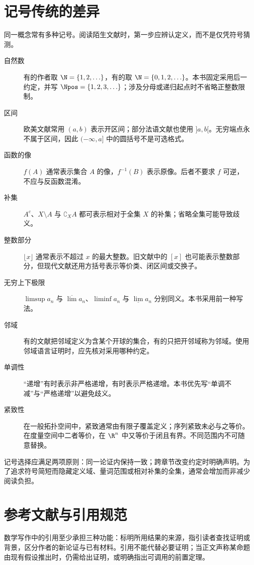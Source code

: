 \section{记号传统的差异}

同一概念常有多种记号。阅读陌生文献时，第一步应辨认定义，而不是仅凭符号猜测。

\begin{description}
 \item[自然数] 有的作者取 $\N=\{1,2,\ldots\}$，有的取 $\N=\{0,1,2,\ldots\}$。本书固定采用后一约定，并写 $\Npos=\{1,2,3,\ldots\}$；涉及分母或递归起点时不省略正整数限制。
 \item[区间] 欧美文献常用 $(a,b)$ 表示开区间；部分法语文献也使用 $]a,b[$。无穷端点永不属于区间，因此 $(-\infty,a]$ 中的圆括号不是可选格式。
 \item[函数的像] $f(A)$ 通常表示集合 $A$ 的像，$f^{-1}(B)$ 表示原像。后者不要求 $f$ 可逆，不应与反函数混淆。
 \item[补集] $A^c$、$X\setminus A$ 与 $\complement_X A$ 都可表示相对于全集 $X$ 的补集；省略全集可能导致歧义。
 \item[整数部分] $\lfloor x\rfloor$ 通常表示不超过 $x$ 的最大整数。旧文献中的 $[x]$ 也可能表示整数部分，但现代文献还用方括号表示等价类、闭区间或交换子。
 \item[无穷上下极限] $\limsup a_n$ 与 $\overline{\lim}a_n$、$\liminf a_n$ 与 $\underline{\lim}a_n$ 分别同义。本书采用前一种写法。
 \item[邻域] 有的文献把邻域定义为含某个开球的集合，有的只把开邻域称为邻域。使用邻域语言证明时，应先核对采用哪种约定。
 \item[单调性] “递增”有时表示非严格递增，有时表示严格递增。本书优先写“单调不减”与“严格递增”以避免歧义。
 \item[紧致性] 在一般拓扑空间中，紧致通常由有限子覆盖定义；序列紧致未必与之等价。在度量空间中二者等价，在 $\R^n$ 中又等价于闭且有界。不同范围内不可随意替换。
\end{description}

记号选择应满足两项原则：同一论证内保持一致；跨章节改变约定时明确声明。为了追求符号简短而隐藏定义域、量词范围或相对补集的全集，通常会增加而非减少阅读负担。

\section{参考文献与引用规范}

数学写作中的引用至少承担三种功能：标明所用结果的来源，指引读者查找证明或背景，区分作者的新论证与已有材料。引用不能代替必要证明；当正文声称某命题由现有假设推出时，仍需给出证明，或明确指出可调用的前置定理。

